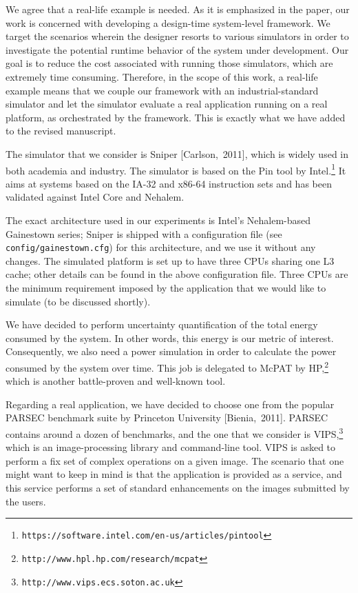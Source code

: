 \begin{authors}
We agree that a real-life example is needed. As it is emphasized in the paper,
our work is concerned with developing a design-time system-level framework. We
target the scenarios wherein the designer resorts to various simulators in order
to investigate the potential runtime behavior of the system under development.
Our goal is to reduce the cost associated with running those simulators, which
are extremely time consuming. Therefore, in the scope of this work, a real-life
example means that we couple our framework with an industrial-standard simulator
and let the simulator evaluate a real application running on a real platform, as
orchestrated by the framework. This is exactly what we have added to the revised
manuscript.

The simulator that we consider is Sniper [Carlson,~2011], which is widely used
in both academia and industry. The simulator is based on the Pin tool by
Intel.\footnote{\texttt{https://software.intel.com/en-us/articles/pintool}} It
aims at systems based on the IA-32 and x86-64 instruction sets and has been
validated against Intel Core and Nehalem.

The exact architecture used in our experiments is Intel's Nehalem-based
Gainestown series; Sniper is shipped with a configuration file (see
\texttt{config/gainestown.cfg}) for this architecture, and we use it without any
changes. The simulated platform is set up to have three CPUs sharing one L3
cache; other details can be found in the above configuration file. Three CPUs
are the minimum requirement imposed by the application that we would like to
simulate (to be discussed shortly).

We have decided to perform uncertainty quantification of the total energy
consumed by the system. In other words, this energy is our metric of interest.
Consequently, we also need a power simulation in order to calculate the power
consumed by the system over time. This job is delegated to McPAT by
HP,\footnote{\texttt{http://www.hpl.hp.com/research/mcpat}} which is another
battle-proven and well-known tool.

Regarding a real application, we have decided to choose one from the popular
PARSEC benchmark suite by Princeton University [Bienia,~2011]. PARSEC contains
around a dozen of benchmarks, and the one that we consider is
VIPS,\footnote{\texttt{http://www.vips.ecs.soton.ac.uk}} which is an
image-processing library and command-line tool. VIPS is asked to perform a fix
set of complex operations on a given image. The scenario that one might want to
keep in mind is that the application is provided as a service, and this service
performs a set of standard enhancements on the images submitted by the users.


\end{authors}
